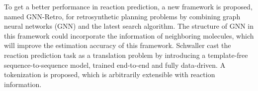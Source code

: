 \documentclass[%
 aip,
 jmp,%
 amsmath,amssymb,
 reprint,%
]{revtex4-2}
\begin{document}
To get a better performance in reaction prediction, a new framework is proposed, named GNN-Retro, for retrosynthetic planning problems by combining graph neural networks (GNN) and the latest search algorithm\cite{han2022gnn}. 
The structure of GNN in this framework could incorporate the information of neighboring molecules, which will improve the estimation accuracy of this framework\cite{han2022gnn}.
Schwaller cast the reaction prediction task as a translation problem\cite{buden2009cultural, ordudari2007translation} by introducing a template-free sequence-to-sequence model, trained end-to-end and fully data-driven. A tokenization is proposed, which is arbitrarily extensible with reaction information\cite{schwaller2018found}.
\end{document}
